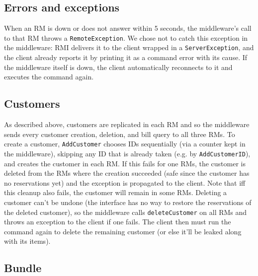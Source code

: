 \documentclass[10pt]{article}
\newcommand{\code}[1]{\lstinline{#1}}
\begin{document}
\subsection{Errors and exceptions}

When an RM is down or does not answer within 5 seconds, the middleware's call to
that RM throws a \code{RemoteException}. We chose not to catch this exception in
the middleware: RMI delivers it to the client wrapped in a \code{ServerException},
and the client already reports it by printing it as a command error with its
cause. If the middleware itself is down, the client automatically reconnects to
it and executes the command again.

\subsection{Customers}

As described above, customers are replicated in each RM and so the middleware
sends every customer creation, deletion, and bill query to all three RMs. To
create a customer, \code{AddCustomer} chooses IDs sequentially (via a counter kept
in the middleware), skipping any ID that is already taken (e.g. by
\code{AddCustomerID}), and creates the customer in each RM. If this fails for one
RMs, the customer is deleted from the RMs where the creation succeeded (safe since
the customer has no reservations yet) and the exception is propagated to the
client. Note that iff this cleanup also fails, the customer will remain in some
RMs. Deleting a customer can't be undone (the interface has no way to restore
the reservations of the deleted customer), so the middleware calls
\code{deleteCustomer} on all RMs and throws an exception to the client if one
fails. The client then must run the command again to delete the remaining
customer (or else it'll be leaked along with its items).

\subsection{Bundle}
\end{document}
